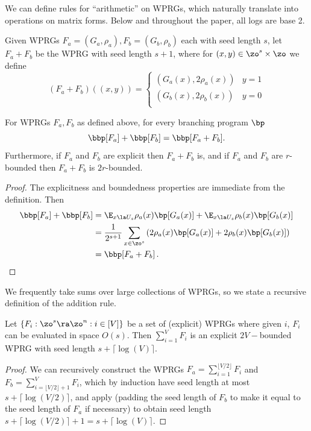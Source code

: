 We can define rules for ``arithmetic'' on WPRGs, which naturally translate into operations on matrix forms. Below and throughout the paper, all logs are base 2.

\begin{definition}\label{def:addRule}
Given WPRGs $F_a=(G_a,\rho_a),F_b=(G_b,\rho_b)$ each with seed length $s$, let $F_a+F_b$ be the WPRG with seed length $s+1$, where for $(x,y)\in \zo^s\times\zo$ we define
\[
(F_a+F_b)((x,y)) = \begin{cases}
(G_a(x),2\rho_a(x)) & y=1\\
(G_b(x),2\rho_b(x)) & y=0\\
\end{cases}\]
\end{definition}
\begin{lemma}
For WPRGs $F_a,F_b$ as defined above, for every branching program $\bp$
$$\bbp[F_a]+\bbp[F_b]=\bbp[F_a+F_b].$$
Furthermore, if $F_a$ and $F_b$ are explicit then $F_a+F_b$ is, and if $F_a$ and $F_b$ are $r$-bounded then $F_a+F_b$ is $2r$-bounded.
\end{lemma}
\begin{proof}
The explicitness and boundedness properties are immediate from the definition.
Then %
\begin{align*}
    \bbp[F_a]+\bbp[F_b] &= \E_{x\la U_s}\rho_a(x)\bp[G_a(x)]+\E_{x\la U_s}\rho_b(x)\bp[G_b(x)]\\
    &= \frac{1}{2^{s+1}}\sum_{x\in \zo^s}\left(2\rho_a(x)\bp[G_a(x)]+2\rho_b(x)\bp[G_b(x)]\right)\\
    &= \bbp[F_a+F_b]\,.  \qedhere
\end{align*}
\end{proof}
We frequently take sums over large collections of WPRGs, so we state a recursive definition of the addition rule.
\begin{proposition}\label{prop:multiAdd}
Let $\{F_i:\zo^s\ra\zo^n:i\in [V]\}$ be a set of (explicit) WPRGs where given $i$, $F_i$ can be evaluated in space $O(s)$. Then
$\sum_{i=1}^VF_i$
is an explicit $2V-$bounded WPRG with seed length $s+\lceil\log(V)\rceil$.
\end{proposition}
\begin{proof}
We can recursively construct the WPRGs $F_a=\sum_{i=1}^{\lfloor V/2\rfloor}F_i$ and $F_b=\sum_{i=\lfloor V/2\rfloor+1}^{V}F_i$, which by induction have seed length at most $s+\lceil \log(V/2)\rceil$, and apply  (padding the seed length of $F_b$ to make it equal to the seed length of $F_a$ if necessary) to obtain seed length $s+\lceil \log(V/2)\rceil +1=s+\lceil \log(V)\rceil$.
\end{proof}

